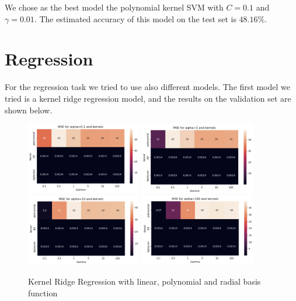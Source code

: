 \documentclass[12pt]{article}
\begin{document}
We chose as the best model the polynomial kernel SVM with $C=0.1$ and $\gamma=0.01$.
The estimated accuracy of this model on the test set is $48.16\%$.

\section{Regression}
For the regression task we tried to use also different models.
The first model we tried is a kernel ridge regression model, and the results
on the validation set are shown below.

\begin{figure}[h]
    \centering
    \includegraphics[width=0.45\textwidth]{kernel_0.1}
    \includegraphics[width=0.45\textwidth]{kernel_1}
    \includegraphics[width=0.45\textwidth]{kernel_10}
    \includegraphics[width=0.45\textwidth]{kernel_100}
    \caption{Kernel Ridge Regression with linear, polynomial and radial basis function}
    \label{fig:kernel_ridge_regression}
\end{figure}
\end{document}
